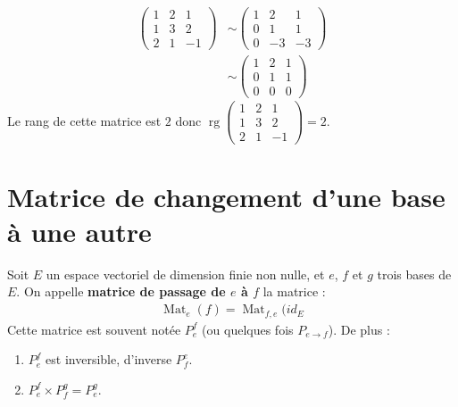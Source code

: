 \documentclass[../main.tex]{subfiles}
\begin{document}
\begin{align*}
    \begin{pmatrix}
        1 & 2 & 1 \\
        1 & 3 & 2 \\
        2 & 1 & -1
    \end{pmatrix} &\sim \begin{pmatrix}
        1 & 2 & 1 \\
        0 & 1 & 1 \\
        0 & -3 & -3
    \end{pmatrix} \\
    &\sim \begin{pmatrix}
        1 & 2 & 1 \\
        0 & 1 & 1 \\
        0 & 0 & 0
    \end{pmatrix}
\end{align*}
Le rang de cette matrice est $2$ donc $\operatorname{rg} \begin{pmatrix}
    1 & 2 & 1 \\
    1 & 3 & 2 \\
    2 & 1 & -1
\end{pmatrix} = 2$. 

\section{Matrice de changement d'une base à une autre}
\begin{tcolorbox}[title=Théorème 28.38, title filled=false, colframe=orange, colback=orange!10!white]
    Soit $E$ un espace vectoriel de dimension finie non nulle, et $e$, $f$ et $g$ trois bases de $E$. On appelle \textbf{matrice de passage de $e$ à $f$} la matrice :
    \begin{align*}
        \operatorname{Mat}_{e}(f) = \operatorname{Mat}_{f,e}(id_E
    \end{align*}
    Cette matrice est souvent notée $P_e^f$ (ou quelques fois $P_{e\to f}$). De plus :
    \begin{enumerate}
        \item $P_e^f$ est inversible, d'inverse $P_f^e$.
        \item $P_e^f\times P_f^g = P_e^g$. 
    \end{enumerate}
\end{tcolorbox}
\end{document}
